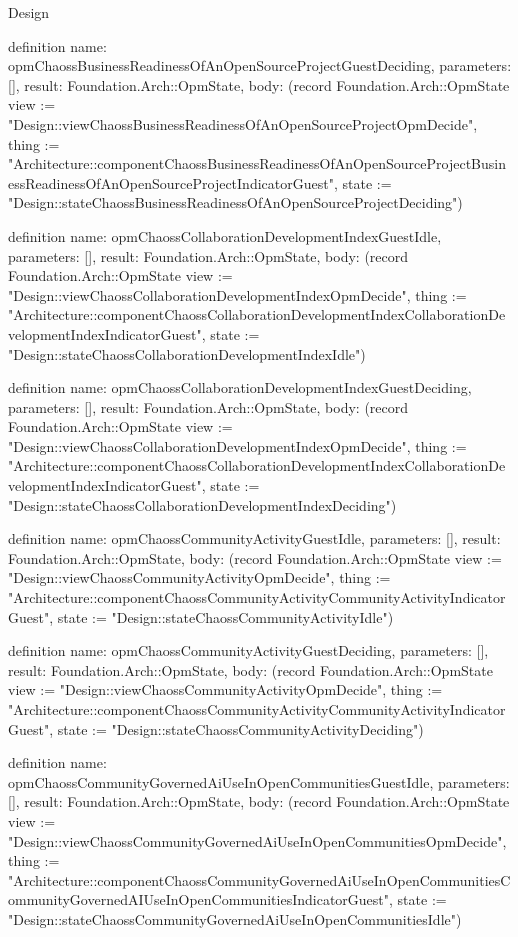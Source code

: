 \begin{lexlean}{Design}
\begin{semanticmodule}
definition{
  name: opmChaossBusinessReadinessOfAnOpenSourceProjectGuestDeciding,
  parameters: [],
  result: Foundation.Arch::OpmState,
  body: (record Foundation.Arch::OpmState {view := "Design::viewChaossBusinessReadinessOfAnOpenSourceProjectOpmDecide", thing := "Architecture::componentChaossBusinessReadinessOfAnOpenSourceProjectBusinessReadinessOfAnOpenSourceProjectIndicatorGuest", state := "Design::stateChaossBusinessReadinessOfAnOpenSourceProjectDeciding"})
}

definition{
  name: opmChaossCollaborationDevelopmentIndexGuestIdle,
  parameters: [],
  result: Foundation.Arch::OpmState,
  body: (record Foundation.Arch::OpmState {view := "Design::viewChaossCollaborationDevelopmentIndexOpmDecide", thing := "Architecture::componentChaossCollaborationDevelopmentIndexCollaborationDevelopmentIndexIndicatorGuest", state := "Design::stateChaossCollaborationDevelopmentIndexIdle"})
}

definition{
  name: opmChaossCollaborationDevelopmentIndexGuestDeciding,
  parameters: [],
  result: Foundation.Arch::OpmState,
  body: (record Foundation.Arch::OpmState {view := "Design::viewChaossCollaborationDevelopmentIndexOpmDecide", thing := "Architecture::componentChaossCollaborationDevelopmentIndexCollaborationDevelopmentIndexIndicatorGuest", state := "Design::stateChaossCollaborationDevelopmentIndexDeciding"})
}

definition{
  name: opmChaossCommunityActivityGuestIdle,
  parameters: [],
  result: Foundation.Arch::OpmState,
  body: (record Foundation.Arch::OpmState {view := "Design::viewChaossCommunityActivityOpmDecide", thing := "Architecture::componentChaossCommunityActivityCommunityActivityIndicatorGuest", state := "Design::stateChaossCommunityActivityIdle"})
}

definition{
  name: opmChaossCommunityActivityGuestDeciding,
  parameters: [],
  result: Foundation.Arch::OpmState,
  body: (record Foundation.Arch::OpmState {view := "Design::viewChaossCommunityActivityOpmDecide", thing := "Architecture::componentChaossCommunityActivityCommunityActivityIndicatorGuest", state := "Design::stateChaossCommunityActivityDeciding"})
}

definition{
  name: opmChaossCommunityGovernedAiUseInOpenCommunitiesGuestIdle,
  parameters: [],
  result: Foundation.Arch::OpmState,
  body: (record Foundation.Arch::OpmState {view := "Design::viewChaossCommunityGovernedAiUseInOpenCommunitiesOpmDecide", thing := "Architecture::componentChaossCommunityGovernedAiUseInOpenCommunitiesCommunityGovernedAIUseInOpenCommunitiesIndicatorGuest", state := "Design::stateChaossCommunityGovernedAiUseInOpenCommunitiesIdle"})
}


\end{semanticmodule}
\end{lexlean}
